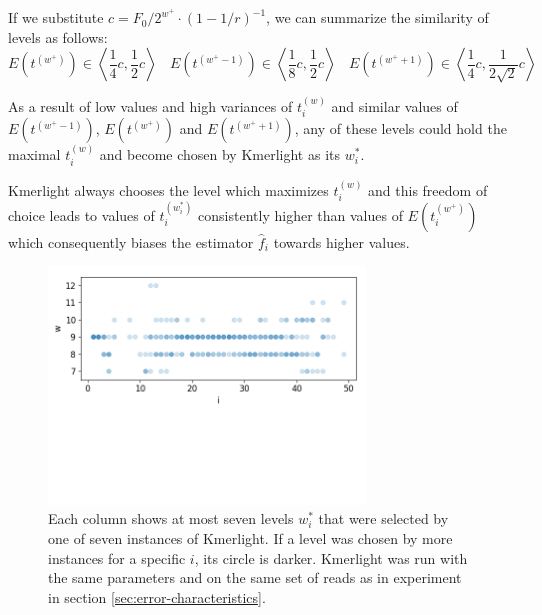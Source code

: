 If we substitute $c = F_0/2^{w^+} \cdot (1-1/r)^{-1}$,
we can summarize the similarity of levels as follows:
\begin{equation} \label{eq:level-similarity}
E(t^{(w^+)}) \in \left\langle \frac{1}{4}c, \frac{1}{2}c  \right\rangle ~~~~
E(t^{(w^+-1)}) \in \left\langle \frac{1}{8}c, \frac{1}{2}c  \right\rangle ~~~~
E(t^{(w^++1)}) \in \left\langle \frac{1}{4}c,\frac{1}{2\sqrt{2}}c  \right\rangle
\end{equation}

As a result of low values and high variances of $t_i^{(w)}$ and similar
values of $E(t^{(w^+-1)})$, $E(t^{(w^+)})$ and $E(t^{(w^++1)})$, any of these levels could
hold the maximal $t_i^{(w)}$ and become chosen by Kmerlight as its $w^*_i$. 

Kmerlight always chooses the level which maximizes $t_i^{(w)}$ and this freedom of choice 
leads to values of $t_i^{(w^*_i)}$ consistently higher than values of $E(t_i^{(w^+)})$
which consequently biases the estimator $\hat f_i$ towards higher values.

\begin{figure}[h]
\centerline{\includegraphics[width=0.75\textwidth, trim={0cm, 5.2cm, 0cm, 0cm}, clip]{images/kmerlight_wstar.png}}
\caption[$w_i^*$ selected by Kmerlight]{Each column 
shows at most seven levels $w_i^*$ that were selected by one of seven instances of Kmerlight.
If a level was chosen by more instances for a specific $i$, its circle is darker.
Kmerlight was run with the same parameters and on the same set of reads as in 
experiment in section \ref{sec:error-characteristics}.}
\label{img:w-selected-by-kmerlight}
\end{figure}

